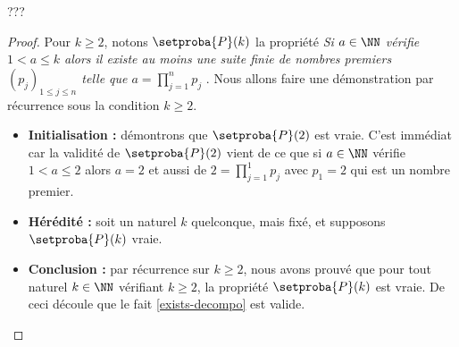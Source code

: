 ??? 


\begin{proof}
	Pour $k \geq 2$, notons $\setproba{P}(k)$ la propriété \emph{\og Si $a \in \NN$ vérifie $1 < a \leq k$ alors il existe au moins une suite finie de nombres premiers $(p_j)_{1 \leq j \leq n}$ telle que $\displaystyle a = \prod_{j=1}^{n} p_j$ \fg}. Nous allons faire une démonstration par récurrence sous la condition $k \geq 2$.
	
	\begin{itemize}[label=\small\textbullet]
		\medskip
		\item \textbf{Initialisation :} démontrons que $\setproba{P}(2)$ est vraie. C'est immédiat car la validité de $\setproba{P}(2)$ vient de ce que si $a \in \NN$ vérifie $1 < a \leq 2$ alors $a = 2$ et aussi de $\displaystyle 2 = \prod_{j=1}^{1} p_j$ avec $p_1 = 2$ qui est un nombre premier. 


		\medskip
		\item \textbf{Hérédité :} soit un naturel $k$ quelconque, mais fixé, et supposons $\setproba{P}(k)$ vraie. 


		\medskip
		\item \textbf{Conclusion :} par récurrence sur $k \geq 2$, nous avons prouvé que pour tout naturel $k \in \NN$ vérifiant $k \geq 2$, la propriété $\setproba{P}(k)$ est vraie.
		De ceci découle que le fait \ref{exists-decompo} est valide.
	\end{itemize}
\end{proof}